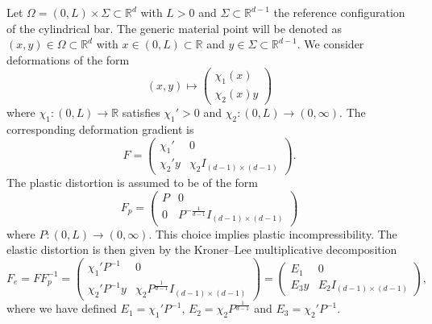 \documentclass[a4paper,10pt,twoside]{amsbook}
\numberwithin{section}{chapter}
\numberwithin{equation}{chapter}
\theoremstyle{definition}
\begin{document}
Let $\Omega=(0,L)\times\Sigma\subset\mathbb{R}^d$ with $L>0$ and $\Sigma\subset\mathbb{R}^{d-1}$ the reference configuration of the cylindrical bar. The generic material point will be denoted as $(x,y)\in\Omega\subset\mathbb{R}^d$ with $x\in(0,L)\subset\mathbb{R}$ and $y\in\Sigma\subset\mathbb{R}^{d-1}$. We consider deformations of the form
\begin{equation}
\label{eqn:necking-large:deformation}
(x,y)\mapsto\begin{pmatrix}
\chi_1(x) \\
\chi_2(x)y
\end{pmatrix}
\end{equation}
where $\chi_1\colon(0,L)\to\mathbb{R}$ satisfies $\chi_1'>0$ and $\chi_2\colon(0,L)\to(0,\infty)$. The corresponding deformation gradient is
\[
F=\begin{pmatrix}
\chi_1' & 0 \\
\chi_2'y & \chi_2I_{(d-1)\times(d-1)}
\end{pmatrix}.
\]
The plastic distortion is assumed to be of the form
\begin{equation}
\label{eqn:necking-large:plastic}
F_p=\begin{pmatrix}
P & 0 \\
0 & P^{-\frac{1}{d-1}}I_{(d-1)\times(d-1)}
\end{pmatrix}
\end{equation}
where $P\colon(0,L)\to(0,\infty)$. This choice implies plastic incompressibility. The elastic distortion is then given by the Kroner--Lee multiplicative decomposition
\[
F_e=FF_p^{-1}=\begin{pmatrix}
\chi_1'P^{-1} & 0 \\
\chi_2'P^{-1}y & \chi_2P^\frac{1}{d-1}I_{(d-1)\times(d-1)}
\end{pmatrix}=
\begin{pmatrix}
E_1 & 0 \\
E_3y & E_2I_{(d-1)\times(d-1)}
\end{pmatrix},
\]
where we have defined $E_1=\chi_1'P^{-1}$, $E_2=\chi_2P^{\frac{1}{d-1}}$ and $E_3=\chi_2'P^{-1}$.
\end{document}
